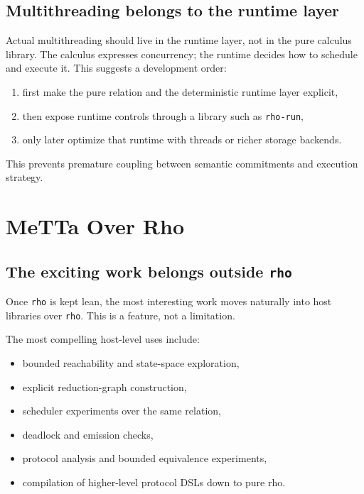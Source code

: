 \documentclass[11pt]{article}
\newcommand{\code}[1]{\texttt{#1}}
\begin{document}
\subsection{Multithreading belongs to the runtime layer}

Actual multithreading should live in the runtime layer, not in the pure calculus library. The calculus expresses concurrency; the runtime decides how to schedule and execute it. This suggests a development order:

\begin{enumerate}
  \item first make the pure relation and the deterministic runtime layer explicit,
  \item then expose runtime controls through a library such as \code{rho-run},
  \item only later optimize that runtime with threads or richer storage backends.
\end{enumerate}

This prevents premature coupling between semantic commitments and execution strategy.

\section{MeTTa Over Rho}

\subsection{The exciting work belongs outside \code{rho}}

Once \code{rho} is kept lean, the most interesting work moves naturally into host libraries over \code{rho}. This is a feature, not a limitation.

The most compelling host-level uses include:

\begin{itemize}
  \item bounded reachability and state-space exploration,
  \item explicit reduction-graph construction,
  \item scheduler experiments over the same relation,
  \item deadlock and emission checks,
  \item protocol analysis and bounded equivalence experiments,
  \item compilation of higher-level protocol DSLs down to pure rho.
\end{itemize}
\end{document}
